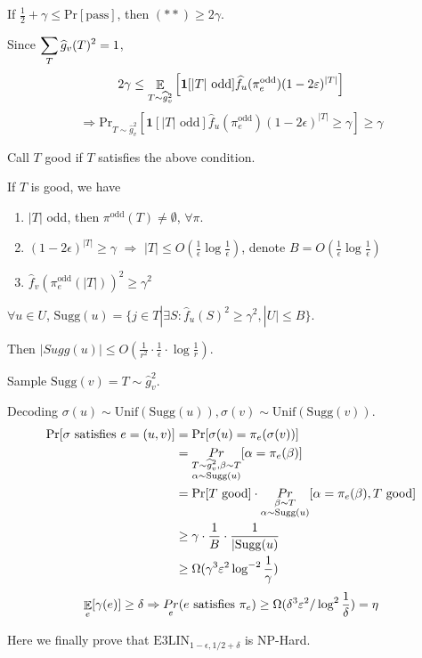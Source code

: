 If  $ \frac{1}{2}+\gamma \leq \mathrm{Pr}[\mathrm{pass}] $, then  $ (\ast\ast) \geq 2\gamma $.

Since  $ \dps\sum_{T}\hat{g}_v(T)^2=1 $, 
\[2\gamma \leq \Ebb_{T\sim \hat{g}_v^2}\left[\mathbf{1}[|T|\text{ odd}]\hat{f}_u(\pi_e^{\text{odd}})(1-2\epsilon)^{|T|}\right]\]
\[\Rightarrow \mathrm{Pr}_{T\sim \hat{g}_v^2}\left[\mathbf{1}[|T|\text{ odd}]\hat{f}_u(\pi_e^{\text{odd}})(1-2\epsilon)^{|T|} \geq \gamma\right] \geq \gamma\] 

Call  $ T $ good if  $ T $ satisfies the above condition.

If  $ T $ is good, we have 
\begin{enumerate}[label=\arabic*)]
    \item  $ |T| $ odd, then  $ \pi^{\text{odd}}(T)\neq \emptyset $,  $ \forall \pi $.
    \item  $ (1-2\epsilon)^{|T|} \geq \gamma $ $ \Rightarrow  $  $ |T| \leq O(\frac{1}{\epsilon}\log \frac{1}{\epsilon}) $, denote  $ B=O(\frac{1}{\epsilon}\log \frac{1}{\epsilon}) $ 
    \item  $ \hat{f}_v(\pi_e^{\text{odd}}(|T|))^2 \geq \gamma^2 $      
\end{enumerate} 
\begin{definition}
    $ \forall u\in U $,  $ \mathrm{Sugg}(u)=\{j\in T|\exists S:\hat{f}_u(S)^2 \geq \gamma^2,|U| \leq B\} $.  

    Then  $ |Sugg(u)| \leq O(\frac{1}{r^2}\cdot\frac1\epsilon\cdot\log\frac1r) $. 

    Sample  $ \mathrm{Sugg}(v)=T\sim \hat{g}_v^2 $. 
\end{definition}

Decoding  $ \sigma(u)\sim \mathrm{Unif}(\mathrm{Sugg}(u)),\sigma(v)\sim\mathrm{Unif}(\mathrm{Sugg}(v)) $.
\[\begin{aligned}
    \mathrm{Pr}[\sigma\text{ satisfies  $ e=(u,v) $}]&=\mathrm{Pr}[\sigma(u)=\pi_e(\sigma(v))]\\
    &=\mathop{Pr}_{\substack{T\sim \hat{g}_v^2,\beta\sim T\\\alpha\sim \mathrm{Sugg}(u)}}[\alpha=\pi_e(\beta)]\\
    &=\mathrm{Pr}[T\text{ good}]\cdot \mathop{Pr}_{\substack{\beta\sim T\\ \alpha\sim \mathrm{Sugg}(u)}}[\alpha=\pi_e(\beta),T\text{ good}]\\
    & \geq \gamma\cdot\frac{1}{B}\cdot\frac{1}{|\mathrm{Sugg}(u)}\\
    & \geq \Omega(\gamma^3\epsilon^2\log^{-2}\frac{1}{\gamma})
\end{aligned}\] 
\[\Ebb_e[\gamma(e)] \geq \delta\Rightarrow \mathop{Pr}_e(e\text{ satisfies }\pi_e) \geq \Omega(\delta^3\epsilon^2/\log^2\frac{1}{\delta})=\eta\]

Here we finally prove that  $ \mathrm{E3LIN}_{1-\epsilon,1/2+\delta} $ is NP-Hard. 